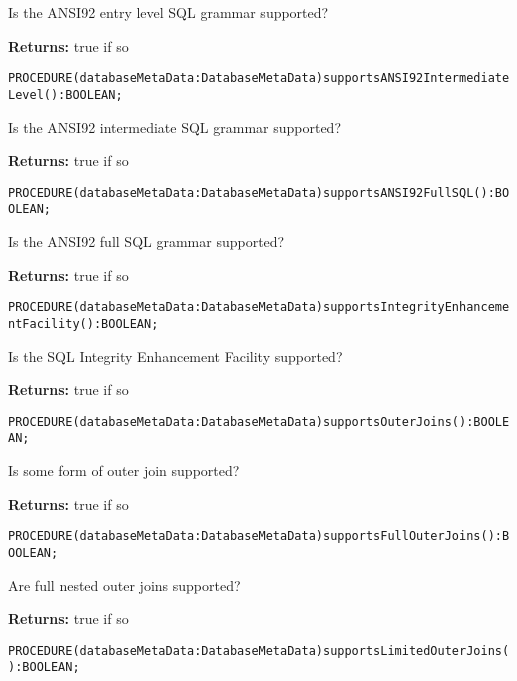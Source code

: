 Is the ANSI92 entry level SQL grammar supported?


{\bf Returns: } 
true if so 




\verb'PROCEDURE(databaseMetaData:DatabaseMetaData)supportsANSI92IntermediateLevel():BOOLEAN;'






Is the ANSI92 intermediate SQL grammar supported? 


{\bf Returns: } 
true if so 




\verb'PROCEDURE(databaseMetaData:DatabaseMetaData)supportsANSI92FullSQL():BOOLEAN;'






Is the ANSI92 full SQL grammar supported? 


{\bf Returns: } 
true if so 




\verb'PROCEDURE(databaseMetaData:DatabaseMetaData)supportsIntegrityEnhancementFacility():BOOLEAN;'






Is the SQL Integrity Enhancement Facility supported? 


{\bf Returns: } 
true if so 




\verb'PROCEDURE(databaseMetaData:DatabaseMetaData)supportsOuterJoins():BOOLEAN;'






Is some form of outer join supported? 


{\bf Returns: } 
true if so 




\verb'PROCEDURE(databaseMetaData:DatabaseMetaData)supportsFullOuterJoins():BOOLEAN;'






Are full nested outer joins supported? 


{\bf Returns: } 
true if so 




\verb'PROCEDURE(databaseMetaData:DatabaseMetaData)supportsLimitedOuterJoins():BOOLEAN;'






